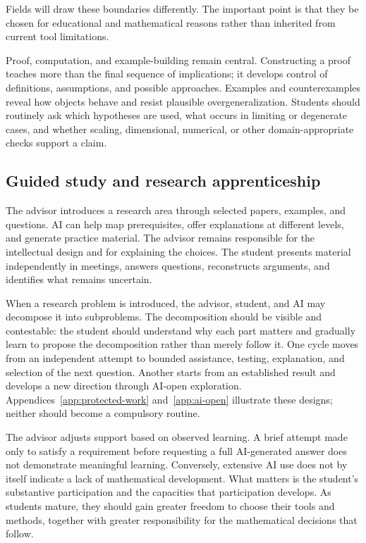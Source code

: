 \documentclass[11pt]{article}
\begin{document}
Fields will draw these boundaries differently.  The important point is that they be
chosen for educational and mathematical reasons rather than inherited from current tool
limitations.

Proof, computation, and example-building remain central.  Constructing a proof teaches
more than the final sequence of implications; it develops control of definitions,
assumptions, and possible approaches.  Examples and counterexamples reveal how objects
behave and resist plausible overgeneralization.  Students should routinely ask which
hypotheses are used, what occurs in limiting or degenerate cases, and whether scaling,
dimensional, numerical, or other domain-appropriate checks support a claim.

\subsection{Guided study and research apprenticeship}
\label{sec:guided-study}

The advisor introduces a research area through selected papers, examples, and questions.
AI can help map prerequisites, offer explanations at different levels, and generate
practice material.  The advisor remains responsible for the intellectual design and for
explaining the choices.  The student presents material independently in meetings,
answers questions, reconstructs arguments, and identifies what remains uncertain.

When a research problem is introduced, the advisor, student, and AI may decompose it into
subproblems.  The decomposition should be visible and contestable: the student should
understand why each part matters and gradually learn to propose the decomposition rather
than merely follow it.  One cycle moves from an independent attempt to bounded assistance, testing,
explanation, and selection of the next question. Another starts from an established
result and develops a new direction through AI-open exploration. Appendices~\ref{app:protected-work}
and~\ref{app:ai-open} illustrate these designs; neither should become a compulsory
routine.

The advisor adjusts support based on observed learning. 
A brief attempt made only to satisfy a requirement before requesting a full AI-generated answer does not demonstrate meaningful learning. 
Conversely, extensive AI use does not by itself indicate a lack of mathematical development. 
What matters is the student's substantive participation and the capacities that participation develops. 
As students mature, they should gain greater freedom to choose
their tools and methods, together with greater responsibility for the mathematical
decisions that follow.
\end{document}
